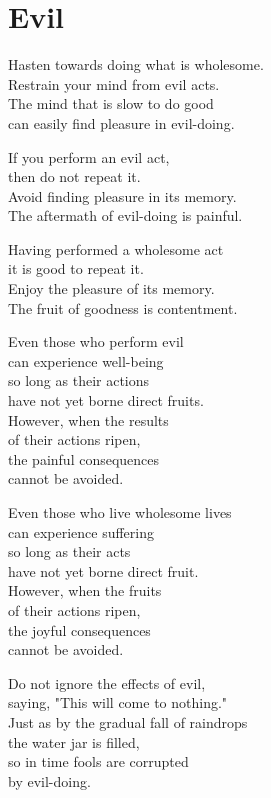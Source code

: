 
\chapter{Evil}


Hasten towards doing what is wholesome.\\
Restrain your mind from evil acts.\\
The mind that is slow to do good\\
can easily find pleasure in evil-doing.


If you perform an evil act,\\
then do not repeat it.\\
Avoid finding pleasure in its memory.\\
The aftermath of evil-doing is painful.


Having performed a wholesome act\\
it is good to repeat it.\\
Enjoy the pleasure of its memory.\\
The fruit of goodness is contentment.


Even those who perform evil\\
can experience well-being\\
so long as their actions\\
have not yet borne direct fruits.\\
However, when the results\\
of their actions ripen,\\
the painful consequences\\
cannot be avoided.


Even those who live wholesome lives\\
can experience suffering\\
so long as their acts\\
have not yet borne direct fruit.\\
However, when the fruits\\
of their actions ripen,\\
the joyful consequences\\
cannot be avoided.


Do not ignore the effects of evil,\\
saying, "This will come to nothing."\\
Just as by the gradual fall of raindrops\\
the water jar is filled,\\
so in time fools are corrupted\\
by evil-doing.

